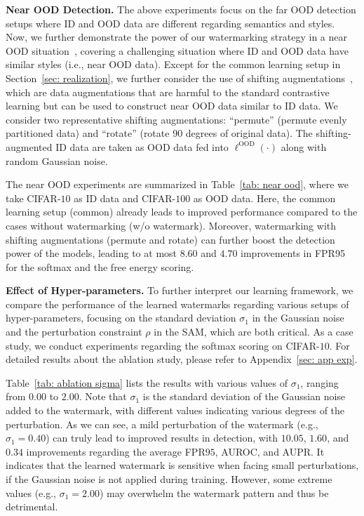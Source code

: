 \documentclass{article}
\begin{document}
\textbf{Near OOD Detection.} The above experiments focus on the far OOD detection setups where ID and OOD data are different regarding semantics and styles. Now, we further demonstrate the power of our watermarking strategy in a near OOD situation~\cite{winkens2020contrastive}, covering a challenging situation where ID and OOD data have similar styles (i.e., near OOD data). Except for the common learning setup in Section~\ref{sec: realization}, we further consider the use of shifting augmentations~\cite{tack2020csi}, which are data augmentations that are harmful to the standard contrastive learning but can be used to construct near OOD data similar to ID data. We consider two representative shifting augmentations: ``permute'' (permute evenly partitioned data) and ``rotate'' (rotate 90 degrees of original data). The shifting-augmented ID data are taken as OOD data fed into  $\ell^\text{OOD}(\cdot)$ along with random Gaussian noise. 

The near OOD experiments are summarized in Table~\ref{tab: near ood}, where we take CIFAR-$10$ as ID data and CIFAR-$100$ as OOD data. Here, the common learning setup (common) already leads to improved performance compared to the cases without watermarking (w/o watermark). Moreover, watermarking with shifting augmentations (permute and rotate) can further boost the detection power of the models, leading to at most $8.60$ and $4.70$ improvements in FPR95 for the softmax and the free energy scoring.








{\textbf{Effect of Hyper-parameters.}} To further interpret our learning framework, we compare the performance of the learned watermarks regarding various setups of hyper-parameters, focusing on the standard deviation $\sigma_1$ in the Gaussian noise and the perturbation constraint $\rho$ in the SAM, which are both critical. As a case study, we conduct experiments regarding the softmax scoring on CIFAR-$10$. For detailed results about the ablation study, please refer to Appendix~\ref{sec: app exp}.   



Table~\ref{tab: ablation sigma} lists the results with various values of $\sigma_1$, ranging from $0.00$ to $2.00$. Note that $\sigma_1$ is the standard deviation of the Gaussian noise added to the watermark, with different values indicating various degrees of the perturbation. As we can see, a mild perturbation of the watermark (e.g., $\sigma_1=0.40$) can truly lead to improved results in detection, with $10.05$, $1.60$, and $0.34$ improvements regarding the average FPR$95$, AUROC, and AUPR. It indicates that the learned watermark is sensitive when facing small perturbations, if the Gaussian noise is not applied during training. However, some extreme values (e.g., $\sigma_1=2.00$) may overwhelm the watermark pattern and thus be detrimental. 
\end{document}

